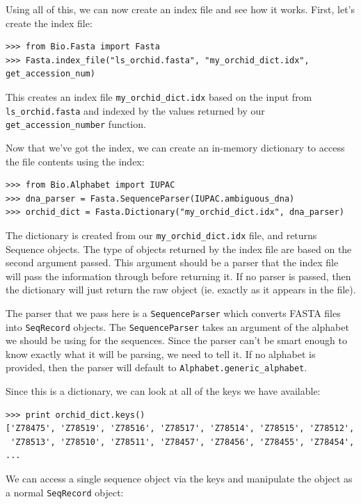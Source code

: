 \documentclass{article}
\begin{document}
Using all of this, we can now create an index file and see how it works. First, let's create the index file:

\begin{verbatim}
>>> from Bio.Fasta import Fasta 
>>> Fasta.index_file("ls_orchid.fasta", "my_orchid_dict.idx", get_accession_num)
\end{verbatim}

This creates an index file \verb|my_orchid_dict.idx| based on the input from \verb|ls_orchid.fasta| and indexed by the values returned by our \verb|get_accession_number| function.


Now that we've got the index, we can create an in-memory dictionary to access the file contents using the index:

\begin{verbatim}
>>> from Bio.Alphabet import IUPAC
>>> dna_parser = Fasta.SequenceParser(IUPAC.ambiguous_dna)
>>> orchid_dict = Fasta.Dictionary("my_orchid_dict.idx", dna_parser)
\end{verbatim} 

The dictionary is created from our \verb|my_orchid_dict.idx| file, and returns Sequence objects. The type of objects returned by the index file are based on the second argument passed. This argument should be a parser that the index file will pass the information through before returning it. If no parser is passed, then the dictionary will just return the raw object (ie. exactly as it appears in the file). 


The parser that we pass here is a \verb|SequenceParser| which converts FASTA files into \verb|SeqRecord| objects. The \verb|SequenceParser| takes an argument of the alphabet we should be using for the sequences. Since the parser can't be smart enough to know exactly what it will be parsing, we need to tell it. If no alphabet is provided, then the parser will default to \verb|Alphabet.generic_alphabet|.


Since this is a dictionary, we can look at all of the keys we have available:

\begin{verbatim}
>>> print orchid_dict.keys()
['Z78475', 'Z78519', 'Z78516', 'Z78517', 'Z78514', 'Z78515', 'Z78512', 
 'Z78513', 'Z78510', 'Z78511', 'Z78457', 'Z78456', 'Z78455', 'Z78454', 
...
\end{verbatim} 

We can access a single sequence object via the keys and manipulate the object as a normal \verb|SeqRecord| object:
\end{document}
